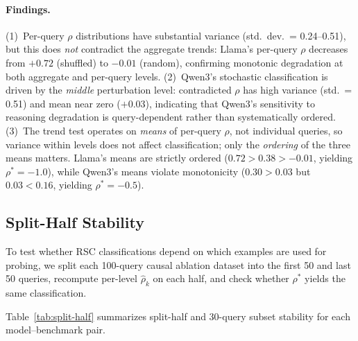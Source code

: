 \documentclass[11pt]{article}
\theoremstyle{definition}
\begin{document}
\paragraph{Findings.}
(1)~Per-query \(\rho\) distributions have substantial variance
(std.\ dev.\ = 0.24--0.51), but this does \emph{not} contradict
the aggregate trends: Llama's per-query \(\rho\) decreases from
\(+0.72\) (shuffled) to \(-0.01\) (random), confirming monotonic
degradation at both aggregate and per-query levels.
(2)~Qwen3's stochastic classification is driven by the
\emph{middle} perturbation level: contradicted \(\rho\) has high
variance (std.\ = 0.51) and mean near zero (\(+0.03\)), indicating
that Qwen3's sensitivity to reasoning degradation is query-dependent rather than systematically ordered.
(3)~The trend test operates on \emph{means} of per-query \(\rho\),
not individual queries, so variance within levels does not affect
classification; only the \emph{ordering} of the three means matters.
Llama's means are strictly ordered (\(0.72 > 0.38 > -0.01\),
yielding \(\rho^* = -1.0\)), while Qwen3's means violate monotonicity
(\(0.30 > 0.03\) but \(0.03 < 0.16\), yielding \(\rho^* = -0.5\)).

\subsection{Split-Half Stability}
\label{sec:appendix-split-half}

To test whether RSC classifications depend on which examples are
used for probing, we split each 100-query causal ablation dataset 
into the first 50 and last 50 queries, recompute per-level 
\(\hat{\rho}_k\) on each half, and check whether \(\rho^*\) yields 
the same classification.

Table~\ref{tab:split-half} summarizes split-half and 30-query subset stability for each model--benchmark pair.
\end{document}
